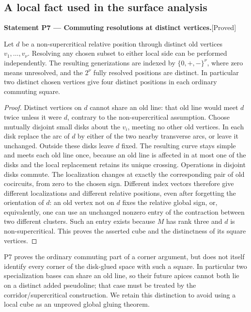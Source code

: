\documentclass[11pt,a4paper]{article}
\newenvironment{resultenv}[3]{\par\medskip\phantomsection\label{#1}\noindent\textbf{Statement #1 --- #3.}\quad\textsf{[#2]}\par\smallskip\noindent\ignorespaces}{\par\medskip}
\begin{document}
\subsection{A local fact used in the surface analysis}

\begin{resultenv}{P7}{Proved}{Commuting resolutions at distinct vertices}
Let $d$ be a non-supercritical relative position through distinct old
vertices $v_1,\ldots,v_\nu$.  Resolving any chosen subset to either
local side can be performed independently.  The resulting
generizations are indexed by $\{0,+,-\}^{\nu}$, where zero means
unresolved, and the $2^\nu$ fully resolved positions are distinct.
In particular two distinct chosen vertices give four distinct
positions in each ordinary commuting square.
\end{resultenv}

\begin{proof}
Distinct vertices on $d$ cannot share an old line: that old line
would meet $d$ twice unless it were $d$, contrary to the
non-supercritical assumption.  Choose mutually disjoint small disks
about the $v_i$, meeting no other old vertices.  In each disk replace
the arc of $d$ by either of the two nearby transverse arcs, or leave
it unchanged.  Outside these disks leave $d$ fixed.  The resulting
curve stays simple and meets each old line once, because an old line
is affected in at most one of the disks and the local replacement
retains its unique crossing.  Operations in disjoint disks commute.
The localization changes at exactly the corresponding pair of old
cocircuits, from zero to the chosen sign.  Different index vectors
therefore give different localizations and different relative
positions, even after forgetting the orientation of $d$: an old
vertex not on $d$ fixes the relative global sign, or, equivalently,
one can use an unchanged nonzero entry of the contraction between two
different clusters.  Such an entry exists because $M$ has rank three
and $d$ is non-supercritical.  This proves the asserted cube and the
distinctness of its square vertices.
\end{proof}

P7 proves the ordinary commuting part of a corner argument, but does
not itself identify every corner of the disk-glued space with such a
square.  In particular two specialization bases can share an old
line, so their future apices cannot both lie on a distinct added
pseudoline; that case must be treated by the corridor/supercritical
construction.  We retain this distinction to avoid using a local
cube as an unproved global gluing theorem.
\end{document}
